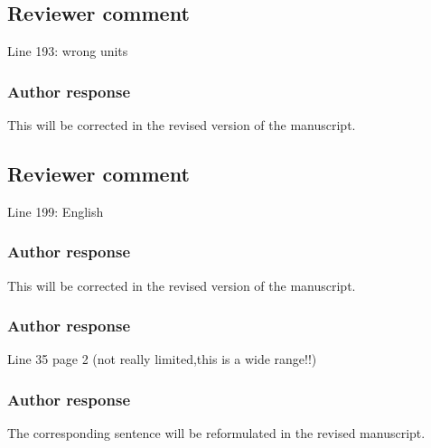 \documentclass[11pt]{scrartcl}
\begin{document}
\subsection*{Reviewer comment}
Line 193: wrong units 

\subsubsection*{Author response}

This will be corrected in the revised version of the manuscript.

\subsection*{Reviewer comment}
Line 199: English

\subsubsection*{Author response}


This will be corrected in the revised version of the manuscript.

%


\subsubsection*{Author response}
Line 35 page 2 (not really limited,this is a wide range!!)

\subsubsection*{Author response}

The corresponding sentence will be reformulated in the revised manuscript.

\end{document}
